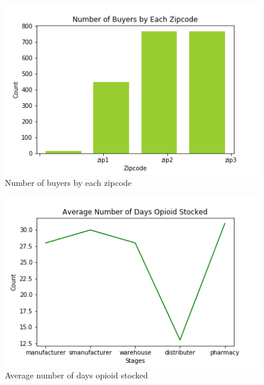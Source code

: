 \documentclass[sigconf]{acmart}
\begin{document}
\begin{figure}[!ht]
 \centering\includegraphics[width=0.75\columnwidth]{images/zipcode_hist.png}
  \caption{Number of buyers by each zipcode}\label{f:ziphist}
\end{figure}

\begin{figure}[!ht]
 \centering\includegraphics[width=0.75\columnwidth]{images/average_hist.png}
  \caption{Average number of days opioid stocked}\label{f:avghist}
\end{figure}
\end{document}
